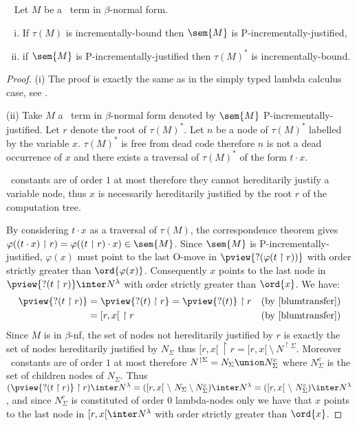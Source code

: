 \begin{proposition} \
\label{prop:incrbound_imp_incrjustified_pcf} Let $M$ be a \pcf\ term in $\beta$-normal form.
\begin{enumerate}[(i)]
\item  If $\tau(M)$ is incrementally-bound then $\sem{M}$ is P-incrementally-justified,
\item  if $\sem{M}$ is P-incrementally-justified
then $\tau(M)^*$ is incrementally-bound.
\end{enumerate}
\end{proposition}
\begin{proof}
(i) The proof is exactly the same as in the simply typed lambda calculus case,
see \cite[Proposition 4.1.5(i)]{blumtransfer}.

\noindent (ii)
Take $M$ a \pcf\ term in $\beta$-normal form denoted by $\sem{M}$ P-incrementally-justified. Let $r$ denote the root of $\tau(M)^*$.
Let $n$ be a node of $\tau(M)^*$ labelled by the variable $x$.
$\tau(M)^*$ is free from dead code therefore $n$ is not a dead occurrence of $x$ and there exists a traversal of $\tau(M)^*$ of the form $t \cdot x$.

\pcf\ constants are of order $1$ at most therefore they cannot hereditarily justify a variable node, thus $x$ is necessarily hereditarily justified by the root $r$ of the computation tree.


By considering $t\cdot x$ as a traversal of $\tau(M)$,  the correspondence theorem gives $\varphi((t \cdot x) \upharpoonright r) = \varphi((t \upharpoonright r) \cdot x) \in \sem{M}$. Since $\sem{M}$ is P-incrementally-justified, $\varphi(x)$ must point to the last O-move in $\pview{?(\varphi(t \upharpoonright
r))}$ with order strictly greater than $\ord{\varphi(x)}$.
Consequently $x$ points to the last node in $\pview{?(t
\upharpoonright r)} \inter N^{\lambda}$ with order strictly greater than $\ord{x}$. We have:
\begin{align*}
\pview{?(t \upharpoonright r)} &= \pview{?(t) \upharpoonright r} = \pview{?(t)} \upharpoonright r & (\mbox{by \cite[lemma 3.1.23]{blumtransfer}}) \\
& = [r,x[ \ \upharpoonright r & (\mbox{by \cite[proposition 3.1.20]{blumtransfer}})
\end{align*}
Since $M$ is in $\beta$-nf, the set of nodes not hereditarily justified by $r$ is exactly the set of nodes hereditarily justified by $N_{\Sigma}$ thus
$[r,x[ \ \upharpoonright r = [r,x[\ \setminus\  N^{\upharpoonright \Sigma}$.
Moreover \pcf\ constants are of order $1$ at most therefore $N^{\upharpoonright \Sigma} = N_{\Sigma} \union N^c_{\Sigma}$
where $N^c_{\Sigma}$ is the set of children nodes of $N_{\Sigma}$.
Thus $(\pview{?(t \upharpoonright r)}\upharpoonright r) \inter N^{\lambda} =
([r,x[\ \setminus\  N_{\Sigma} \setminus N^c_{\Sigma} ) \inter N^{\lambda} =
([r,x[\ \setminus\  N^c_{\Sigma} )  \inter N^{\lambda}$, and
since $N^c_{\Sigma}$ is constituted of order $0$ lambda-nodes only we have that
$x$ points to the last node in $[r,x[ \inter N^{\lambda}$ with order strictly greater than $\ord{x}$.


\end{proof}
